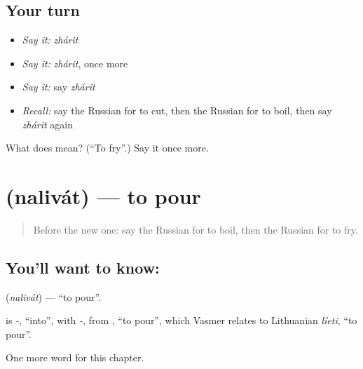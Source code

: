 \subsection*{Your turn}
\begin{itemize}
\raggedright
  \item \emph{Say it:} \emph{zhárit}
  \item \emph{Say it:} \emph{zhárit}, once more
  \item \emph{Say it:} say \emph{zhárit}
  \item \emph{Recall:} say the Russian for to cut, then the Russian for to boil, then say \emph{zhárit} again
\end{itemize}

\begin{tcolorbox}[breakable,colback=teal!4,colframe=teal!35!black,title={Before you move on}]
What does  mean? (\textquotedblleft{}To fry\textquotedblright{}.) Say it once more.
\end{tcolorbox}
\section[\texorpdfstring{\ru{наливать} (nalivát)}{наливать (nalivát)}]{ (nalivát) — to pour}

\label{lesson:RU-C173-nalivat}



\begin{quote}
Before the new one: say the Russian for to boil, then the Russian for to fry.
\end{quote}

\subsection*{You'll want to know: }
\textbf{} (\emph{nalivát}) — \textquotedblleft{}to pour\textquotedblright{}.

\begin{cousinweb}
\textbf{} is \emph{-}, \textquotedblleft{}into\textquotedblright{}, with \emph{-}, from \emph{}, \textquotedblleft{}to pour\textquotedblright{}, which Vasmer relates to Lithuanian \emph{líeti}, \textquotedblleft{}to pour\textquotedblright{}.
\end{cousinweb}

\begin{grammarlens}[title={What you've built}]
One more word for this chapter.
\end{grammarlens}

